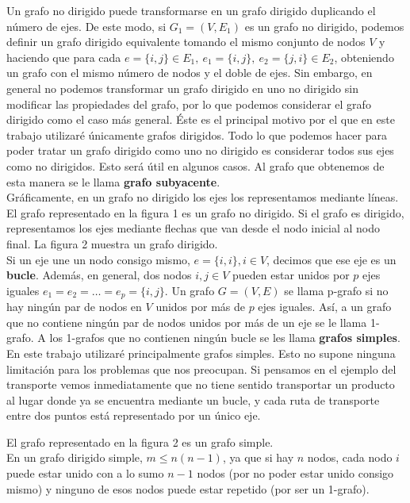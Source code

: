 Un grafo no dirigido puede transformarse en un grafo dirigido duplicando el número de ejes.
De este modo, si $G_1 = (V, E_1)$ es un grafo no dirigido, podemos definir un grafo dirigido equivalente tomando el mismo conjunto de nodos $V$ y haciendo que para cada $ e=\{i,j\} \in E_1,\ e_1=\{i,j\},\ e_2=\{j,i\} \in E_2$, obteniendo un grafo con el mismo número de nodos y el doble de ejes.
Sin embargo, en general no podemos transformar un grafo dirigido en uno no dirigido sin modificar las propiedades del grafo, por lo que podemos considerar el grafo dirigido como el caso más general.
Éste es el principal motivo por el que en este trabajo utilizaré únicamente grafos dirigidos.
Todo lo que podemos hacer para poder tratar un grafo dirigido como uno no dirigido es considerar todos sus ejes como no dirigidos.
Esto será útil en algunos casos.
Al grafo que obtenemos de esta manera se le llama \textbf{grafo subyacente}.\\

Gráficamente, en un grafo no dirigido los ejes los representamos mediante líneas.
El grafo representado en la figura 1 es un grafo no dirigido.
Si el grafo es dirigido, representamos los ejes mediante flechas que van desde el nodo inicial al nodo final.
La figura 2 muestra un grafo dirigido.\\

Si un eje une un nodo consigo mismo, $e=\{i, i\}, i \in V$, decimos que ese eje es un \textbf{bucle}.
Además, en general, dos nodos $i, j \in V$ pueden estar unidos por $p$ ejes iguales $e_1 = e_2 = \dots = e_p = \{i, j\}$.
Un grafo $G=(V,E)$ se llama p-grafo si no hay ningún par de nodos en $V$ unidos por más de $p$ ejes iguales.
Así, a un grafo que no contiene ningún par de nodos unidos por más de un eje se le llama 1-grafo.
A los 1-grafos que no contienen ningún bucle se les llama \textbf{grafos simples}.
En este trabajo utilizaré principalmente grafos simples.
Esto no supone ninguna limitación para los problemas que nos preocupan.
Si pensamos en el ejemplo del transporte vemos inmediatamente que no tiene sentido transportar un producto al lugar donde ya se encuentra mediante un bucle, y cada ruta de transporte entre dos puntos está representado por un único eje.

El grafo representado en la figura 2 es un grafo simple.\\

En un grafo dirigido simple, $m \leq n(n-1)$, ya que si hay $n$ nodos, cada nodo $i$ puede estar unido con a lo sumo $n-1$ nodos (por no poder estar unido consigo mismo) y ninguno de esos nodos puede estar repetido (por ser un 1-grafo).\\


